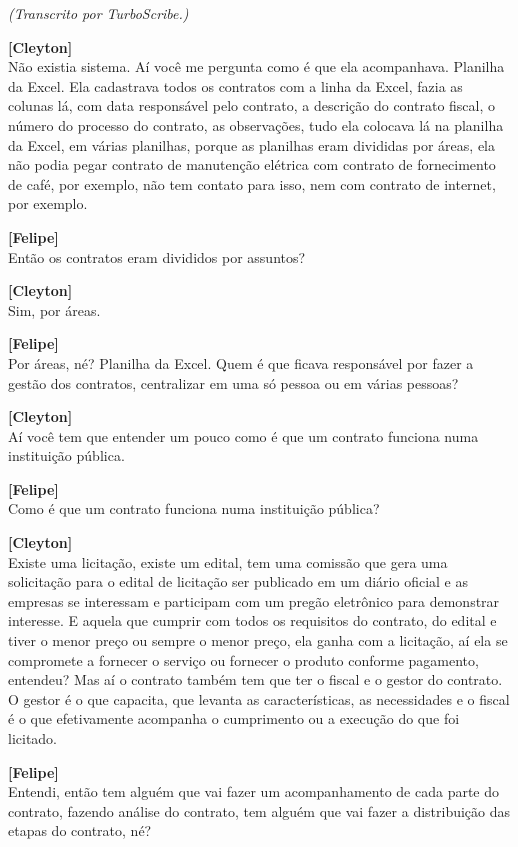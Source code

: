 \documentclass[12pt,a4paper]{article}
\begin{document}
{\small\textit{(Transcrito por TurboScribe.)}}

\begin{entrevista}
    \textbf{[Cleyton]} \\
    Não existia sistema. Aí você me pergunta como é que ela acompanhava. Planilha da Excel. Ela cadastrava todos os contratos com a linha da Excel, fazia as colunas lá, com data responsável pelo contrato, a descrição do contrato fiscal, o número do processo do contrato, as observações, tudo ela colocava lá na planilha da Excel, em várias planilhas, porque as planilhas eram divididas por áreas, ela não podia pegar contrato de manutenção elétrica com contrato de fornecimento de café, por exemplo, não tem contato para isso, nem com contrato de internet, por exemplo.

    \textbf{[Felipe]} \\
    Então os contratos eram divididos por assuntos?

    \textbf{[Cleyton]} \\
    Sim, por áreas.

    \textbf{[Felipe]} \\
    Por áreas, né? Planilha da Excel. Quem é que ficava responsável por fazer a gestão dos contratos, centralizar em uma só pessoa ou em várias pessoas?

    \textbf{[Cleyton]} \\
    Aí você tem que entender um pouco como é que um contrato funciona numa instituição pública.

    \textbf{[Felipe]} \\
    Como é que um contrato funciona numa instituição pública?

    \textbf{[Cleyton]} \\
    Existe uma licitação, existe um edital, tem uma comissão que gera uma solicitação para o edital de licitação ser publicado em um diário oficial e as empresas se interessam e participam com um pregão eletrônico para demonstrar interesse. E aquela que cumprir com todos os requisitos do contrato, do edital e tiver o menor preço ou sempre o menor preço, ela ganha com a licitação, aí ela se compromete a fornecer o serviço ou fornecer o produto conforme pagamento, entendeu? Mas aí o contrato também tem que ter o fiscal e o gestor do contrato. O gestor é o que capacita, que levanta as características, as necessidades e o fiscal é o que efetivamente acompanha o cumprimento ou a execução do que foi licitado.

    \textbf{[Felipe]} \\
    Entendi, então tem alguém que vai fazer um acompanhamento de cada parte do contrato, fazendo análise do contrato, tem alguém que vai fazer a distribuição das etapas do contrato, né?


\end{entrevista}
\end{document}
